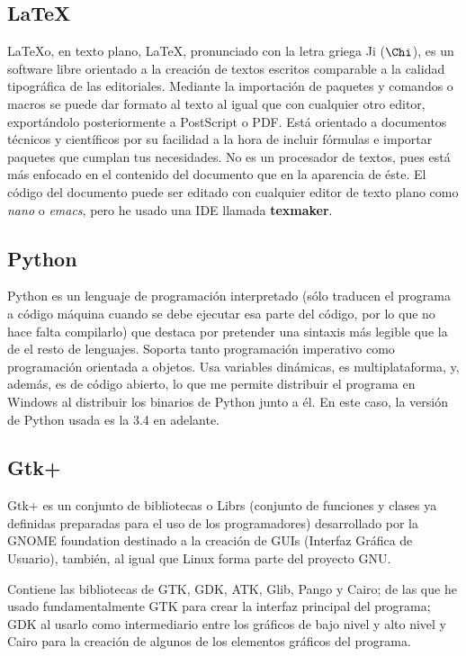 \documentclass[a4paper, 11pt, twoside]{report} %
\begin{document}
\subsection{LaTeX}
\LaTeX\space o, en texto plano, LaTeX, pronunciado con la letra griega 
Ji ($\Chi$), es un software libre orientado a la creación de textos escritos comparable a la calidad tipográfica de las editoriales. Mediante la importación de paquetes y comandos o macros se puede dar formato al texto al igual que con cualquier otro editor, exportándolo posteriormente a PostScript o PDF. Está orientado a documentos técnicos y científicos por su facilidad a la hora de incluir fórmulas e importar paquetes que cumplan tus necesidades. No es un procesador de textos, pues está más enfocado en el contenido del documento que en la aparencia de éste.
El código del documento puede ser editado con cualquier editor de texto plano como \textit{nano} o \textit{emacs}, pero he usado una IDE llamada \textbf{texmaker}.

\subsection{Python}
Python es un lenguaje de programación interpretado (sólo traducen el programa a código máquina cuando se debe ejecutar esa parte del código, por lo que no hace falta compilarlo) que destaca por pretender una sintaxis más legible que la de el resto de lenguajes. Soporta tanto programación imperativo como programación orientada a objetos. Usa variables dinámicas, es multiplataforma, y, además, es de código abierto, lo que me permite distribuir el programa en Windows al distribuir los binarios de Python junto a él. En este caso, la versión de Python usada es la 3.4 en adelante.

\subsection{Gtk+}
Gtk+ es un conjunto de bibliotecas o \glspl{Libr} (conjunto de funciones y clases ya definidas preparadas para el uso de los programadores) desarrollado por la GNOME foundation destinado a la creación de GUIs (Interfaz Gráfica de Usuario), también, al igual que Linux forma parte del proyecto GNU.

Contiene las bibliotecas de GTK, GDK, ATK, Glib, Pango y Cairo; de las que he usado fundamentalmente GTK para crear la interfaz principal del programa; GDK al usarlo como intermediario entre los gráficos de bajo nivel y alto nivel y Cairo para la creación de algunos de los elementos gráficos del programa.
\end{document}

